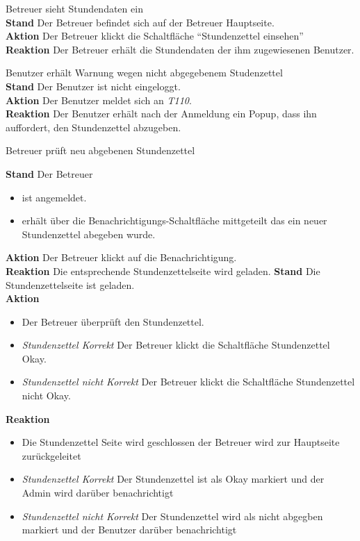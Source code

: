 \begin{requirements}
	 Betreuer sieht Stundendaten ein \\
	        \textbf{Stand} Der Betreuer befindet sich auf der Betreuer Hauptseite. \\
            \textbf{Aktion} Der Betreuer klickt die Schaltfläche "`Stundenzettel einsehen"' \\
            \textbf{Reaktion} Der Betreuer erhält die Stundendaten der ihm zugewiesenen Benutzer.


	 Benutzer erhält Warnung wegen nicht abgegebenem Studenzettel \\
        \textbf{Stand} Der Benutzer ist nicht eingeloggt. \\
        \textbf{Aktion} Der Benutzer meldet sich an \textit{T110}. \\
        \textbf{Reaktion} Der Benutzer erhält nach der Anmeldung ein Popup, dass ihn auffordert, den Stundenzettel abzugeben.

	 Betreuer prüft neu abgebenen Stundenzettel
	\begin{requirements}
	        \textbf{Stand} Der Betreuer
	            \begin{itemize}
	                \item ist angemeldet.
	                \item erhält über die Benachrichtigungs-Schaltfläche mittgeteilt das ein neuer Stundenzettel abegeben wurde.
	            \end{itemize}
            \textbf{Aktion} Der Betreuer klickt auf die Benachrichtigung. \\
            \textbf{Reaktion} Die entsprechende Stundenzettelseite wird  geladen.
	        \textbf{Stand} Die Stundenzettelseite ist geladen. \\
            \textbf{Aktion}
                \begin{itemize}
                    \item Der Betreuer überprüft den Stundenzettel.
                    \item \textit{Stundenzettel Korrekt} Der Betreuer klickt die Schaltfläche Stundenzettel Okay.
                    \item \textit{Stundenzettel nicht Korrekt}  Der Betreuer klickt die Schaltfläche Stundenzettel nicht Okay.
                \end{itemize}
            \textbf{Reaktion}
                \begin{itemize}
                    \item Die Stundenzettel Seite wird geschlossen der Betreuer wird zur Hauptseite zurückgeleitet
                    \item \textit{Stundenzettel Korrekt} Der Stundenzettel ist als Okay markiert und der Admin wird darüber benachrichtigt
                    \item \textit{Stundenzettel nicht Korrekt} Der Stundenzettel wird als nicht abgegben markiert und der Benutzer darüber benachrichtigt
                \end{itemize}
	\end{requirements}


\end{requirements}
